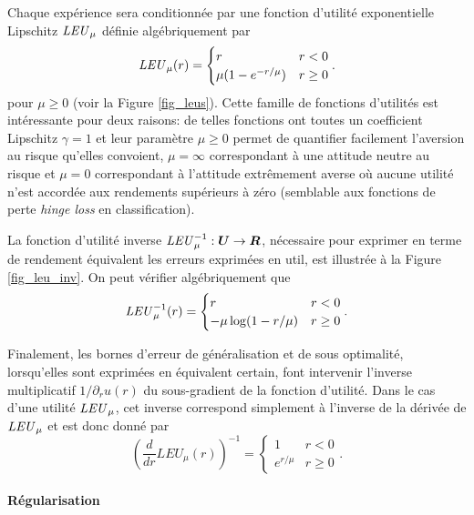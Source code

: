 Chaque expérience sera conditionnée par une fonction d'utilité exponentielle Lipschitz
$\mbox{\textit{LEU}}_\mu$ définie algébriquement par
\begin{equation}
  \mbox{\textit{LEU}}_\mu(r) = 
  \begin{cases}
    r & r<0\\
    \mu(1-e^{-r/\mu}) & r\geq 0
  \end{cases}.
\end{equation}
pour $\mu \geq 0$ (voir la Figure \ref{fig_leus}). Cette famille de fonctions d'utilités est
intéressante pour deux raisons: de telles fonctions ont toutes un coefficient Lipschitz
$\gamma = 1$ et leur paramètre $\mu\geq0$ permet de quantifier facilement l'aversion au risque
qu'elles convoient, $\mu = \infty$ correspondant à une attitude neutre au risque et
$\mu = 0$ correspondant à l'attitude extrêmement averse où aucune utilité n'est accordée aux
rendements supérieurs à zéro (semblable aux fonctions de perte \textit{hinge loss} en
classification).

La fonction d'utilité inverse $\mbox{\textit{LEU}}_\mu^{-1}:\bm{U}\to\bm{R}$, nécessaire pour exprimer en terme de
rendement équivalent les erreurs exprimées en util, est illustrée à la
Figure \ref{fig_leu_inv}. On peut vérifier algébriquement que
\begin{equation}
  \mbox{\textit{LEU}}_\mu^{-1}(r) =
  \begin{cases}
    r & r<0\\
    -\mu\log(1-r/\mu) & r\geq 0
  \end{cases}.
\end{equation}

Finalement, les bornes d'erreur de généralisation et de sous optimalité, lorsqu'elles sont
exprimées en équivalent certain, font intervenir l'inverse multiplicatif
$1/\partial_r u(r)$ du sous-gradient de la fonction d'utilité. Dans le cas d'une utilité
$\mbox{\textit{LEU}}_\mu$, cet inverse correspond simplement à l'inverse de la dérivée de $\mbox{\textit{LEU}}_\mu$ et est
donc donné par
\begin{equation}
  \left(\frac{d}{dr} LEU_\mu(r)\right)^{-1} = 
  \begin{cases}
    1 & r<0\\
    e^{r/\mu} & r\geq 0
  \end{cases}.
\end{equation}


\paragraph{Régularisation}

